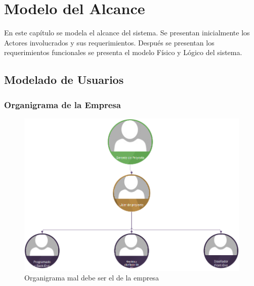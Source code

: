 \chapter{Modelo del Alcance}
\label{cap:reqUsr}

	En este capítulo se modela el alcance del sistema. Se presentan inicialmente los Actores involucrados y sus requerimientos. Después se presentan los requerimientos funcionales se presenta el modelo Físico y Lógico del sistema.


\section{Modelado de Usuarios}

\subsection{Organigrama de la Empresa}



\begin{figure}[htbp]
	\begin{center}
		\includegraphics[width=.8\textwidth]{images/organigramaEm}
		\caption{Organigrama mal debe ser el de la empresa}
		\label{fig:organigrama}
	\end{center}
\end{figure}

